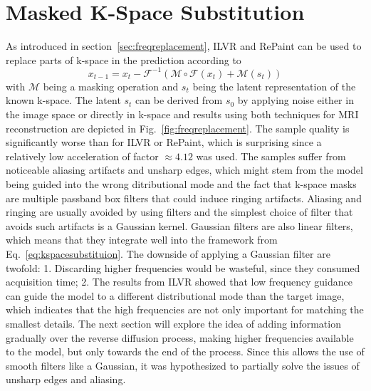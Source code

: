 \section{Masked K-Space Substitution}
As introduced in section~\ref{sec:freqreplacement}, ILVR and RePaint can be used to replace parts of k-space in the prediction according to
\begin{equation}
    \label{eq:kspacesubstituion}
    x_{t-1} = x_t - \mathcal{F}^{-1}\left(\mathcal{M}\circ\mathcal{F}(x_t) + \mathcal{M}(s_t)\right)
\end{equation}
with $\mathcal{M}$ being a masking operation and $s_t$ being the latent representation of the known k-space. The latent $s_t$ can be derived from $s_0$ by applying noise either in the image space or directly in k-space and results using both techniques for MRI reconstruction are depicted in Fig.~\ref{fig:freqreplacement}. The sample quality is significantly worse than for ILVR or RePaint, which is surprising since a relatively low acceleration of factor $\approx 4.12$ was used. The samples suffer from noticeable aliasing artifacts and unsharp edges, which might stem from the model being guided into the wrong ditributional mode and the fact that k-space masks are multiple passband box filters that could induce ringing artifacts. Aliasing and ringing are usually avoided by using filters and the simplest choice of filter that avoids such artifacts is a Gaussian kernel. Gaussian filters are also linear filters, which means that they integrate well into the framework from Eq.~\ref{eq:kspacesubstituion}. The downside of applying a Gaussian filter are twofold: 1. Discarding higher frequencies would be wasteful, since they consumed acquisition time; 2. The results from ILVR showed that low frequency guidance can guide the model to a different distributional mode than the target image, which indicates that the high frequencies are not only important for matching the smallest details. The next section will explore the idea of adding information gradually over the reverse diffusion process, making higher frequencies available to the model, but only towards the end of the process. Since this allows the use of smooth filters like a Gaussian, it was hypothesized to partially solve the issues of unsharp edges and aliasing.

